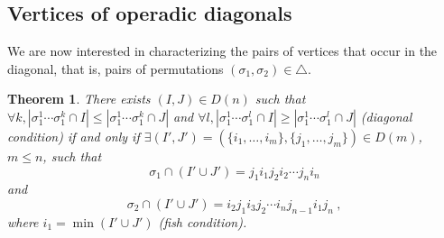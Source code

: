\documentclass{amsart}
\newtheorem{theorem}{Theorem}[section]
\theoremstyle{definition}
\begin{document}

\subsection{Vertices of operadic diagonals}

We are now interested in characterizing the pairs of vertices that occur in the diagonal, that is, pairs of permutations $(\sigma_1,\sigma_2) \in \triangle$. 

\begin{theorem} There exists $(I,J) \in D(n)$ such that $\forall k, |\sigma_1^1\cdots\sigma_1^k \cap I| \leq |\sigma_1^1\cdots\sigma_1^k \cap J|$ and $\forall l, |\sigma_1^1\cdots\sigma_1^l \cap I| \geq |\sigma_1^1\cdots\sigma_1^l \cap J|$ (diagonal condition) if and only if $\exists (I',J')=(\{i_1,\ldots,i_m\},\{j_1,\ldots,j_m\}) \in D(m)$, $m\leq n$, such that \[\sigma_1 \cap (I'\cup J')=j_1 i_1 j_2 i_2 \cdots j_n i_n \] and \[ \sigma_2 \cap (I'\cup J') = i_2 j_1 i_3 j_2 \cdots i_n j_{n-1} i_1 j_n \ , \] where $i_1 = \min (I' \cup J')$ (fish condition). 
\end{theorem}
\end{document}
